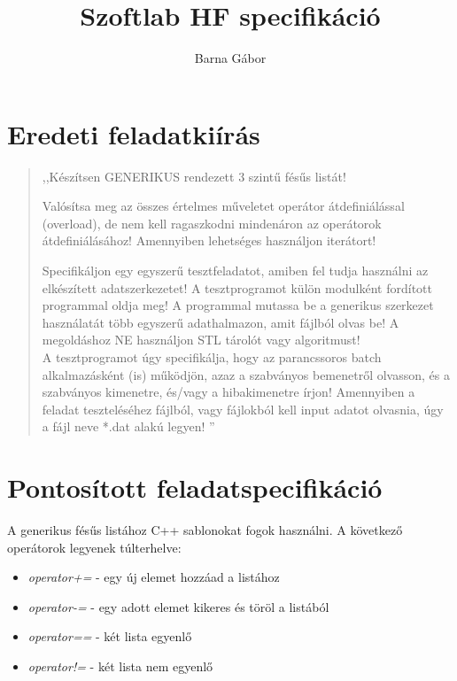 \documentclass[11pt,a4paper]{article}
\author{Barna Gábor}
\title{Szoftlab HF specifikáció}
\begin{document}
\maketitle

\section{Eredeti feladatkiírás}
\begin{quote},,Készítsen GENERIKUS rendezett 3 szintű fésűs listát!

Valósítsa meg az összes értelmes műveletet operátor átdefiniálással
(overload),
de nem kell ragaszkodni mindenáron az operátorok átdefiniálásához!
Amennyiben lehetséges használjon iterátort!

Specifikáljon egy egyszerű tesztfeladatot, amiben fel tudja használni 
az elkészített adatszerkezetet! A tesztprogramot külön modulként
fordított 
programmal oldja meg!
A programmal mutassa be a generikus szerkezet használatát több
egyszerű adathalmazon, amit fájlból olvas be!
A megoldáshoz NE használjon STL tárolót vagy algoritmust!\\
\newline
A tesztprogramot úgy specifikálja, hogy az parancssoros batch
alkalmazásként (is)
működjön, azaz a szabványos bemenetről olvasson, és a szabványos
kimenetre, 
és/vagy a hibakimenetre írjon!
Amennyiben a feladat teszteléséhez fájlból, vagy fájlokból kell input
adatot 
olvasnia, úgy a fájl neve *.dat alakú legyen!
''
\end{quote}

\section{Pontosított feladatspecifikáció}
A generikus fésűs listához C++ sablonokat fogok használni.
A következő operátorok legyenek túlterhelve:
\begin{itemize}
\item \emph{operator+=} - egy új elemet hozzáad a listához
\item \emph{operator-=} - egy adott elemet kikeres és töröl a listából
\item \emph{operator==} - két lista egyenlő
\item \emph{operator!=} - két lista nem egyenlő
\end{itemize}
\end{document}
